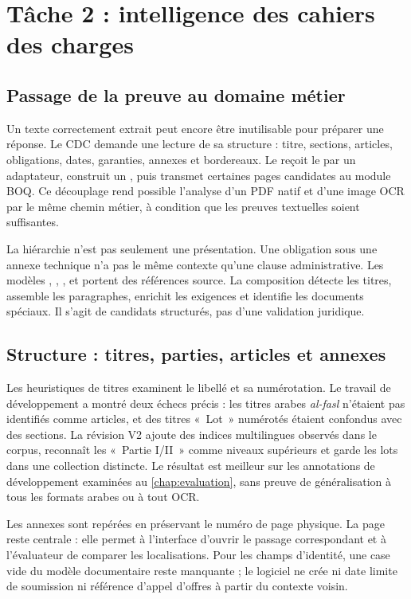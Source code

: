 \chapter{Tâche 2 : intelligence des cahiers des charges}\label{chap:tender}
\section{Passage de la preuve au domaine métier}
Un texte correctement extrait peut encore être inutilisable pour préparer une réponse. Le CDC demande une lecture de sa structure : titre, sections, articles, obligations, dates, garanties, annexes et bordereaux. Le \texttt{} reçoit le \texttt{} par un adaptateur, construit un \texttt{}, puis transmet certaines pages candidates au module BOQ. Ce découplage rend possible l'analyse d'un PDF natif et d'une image OCR par le même chemin métier, à condition que les preuves textuelles soient suffisantes.

La hiérarchie n'est pas seulement une présentation. Une obligation sous une annexe technique n'a pas le même contexte qu'une clause administrative. Les modèles \texttt{}, \texttt{}, \texttt{}, \texttt{} et \texttt{} portent des références source. La composition détecte les titres, assemble les paragraphes, enrichit les exigences et identifie les documents spéciaux. Il s'agit de candidats structurés, pas d'une validation juridique.

\section{Structure : titres, parties, articles et annexes}
Les heuristiques de titres examinent le libellé et sa numérotation. Le travail de développement a montré deux échecs précis : les titres arabes \emph{al-fasl} n'étaient pas identifiés comme articles, et des titres «~Lot~» numérotés étaient confondus avec des sections. La révision V2 ajoute des indices multilingues observés dans le corpus, reconnaît les «~Partie I/II~» comme niveaux supérieurs et garde les lots dans une collection distincte. Le résultat est meilleur sur les annotations de développement examinées au \autoref{chap:evaluation}, sans preuve de généralisation à tous les formats arabes ou à tout OCR.

Les annexes sont repérées en préservant le numéro de page physique. La page reste centrale : elle permet à l'interface d'ouvrir le passage correspondant et à l'évaluateur de comparer les localisations. Pour les champs d'identité, une case vide du modèle documentaire reste manquante ; le logiciel ne crée ni date limite de soumission ni référence d'appel d'offres à partir du contexte voisin.

